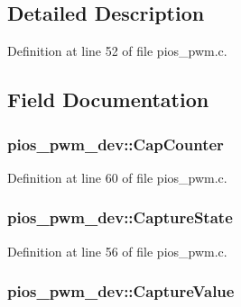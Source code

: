 \subsection{Detailed Description}


Definition at line 52 of file pios\-\_\-pwm.\-c.



\subsection{Field Documentation}
\hypertarget{structpios__pwm__dev_aef85196929d283f9a4925ebd3b353b5f}{
\subsubsection[{Cap\-Counter}]{ pios\-\_\-pwm\-\_\-dev\-::\-Cap\-Counter}}\label{structpios__pwm__dev_aef85196929d283f9a4925ebd3b353b5f}


Definition at line 60 of file pios\-\_\-pwm.\-c.

\hypertarget{structpios__pwm__dev_a31387dc44557e705dc17b4a12313b6a5}{
\subsubsection[{Capture\-State}]{ pios\-\_\-pwm\-\_\-dev\-::\-Capture\-State}}\label{structpios__pwm__dev_a31387dc44557e705dc17b4a12313b6a5}


Definition at line 56 of file pios\-\_\-pwm.\-c.

\hypertarget{structpios__pwm__dev_a4636d6e2c328194059cdaecd349b117a}{
\subsubsection[{Capture\-Value}]{ pios\-\_\-pwm\-\_\-dev\-::\-Capture\-Value}}\label{structpios__pwm__dev_a4636d6e2c328194059cdaecd349b117a}


